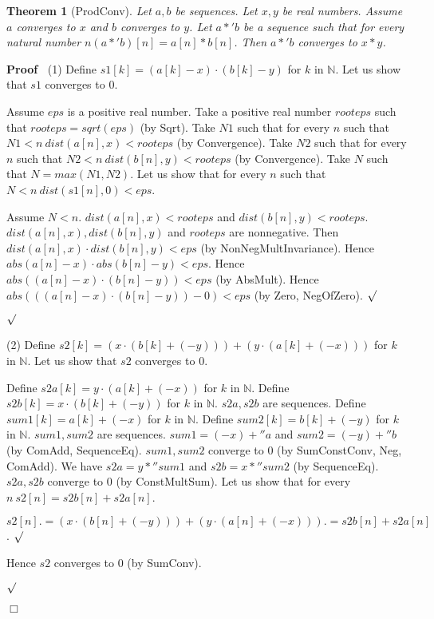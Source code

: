 \documentclass{article}
\newenvironment{forthel}{\begin{leftbar}}{\end{leftbar}}
\newenvironment{proof}{\noindent\textbf{Proof\ }}{\hspace*{\fill}$\Box$\medskip}
\newenvironment{subproof}{\begin{list}{}{}
		\item[\text{Proof}]}{\hfill $\surd$ \end{list}}
\newtheorem{theorem}{Theorem}
\newcommand{\NN}{\mathbb{N}}
\begin{document}
\begin{forthel}
	\begin{theorem}[ProdConv]
	Let $a,b$ be sequences. Let $x,y$ be real numbers. Assume $a$ converges to $x$ and $b$ converges to $y$.
	Let $a *' b$ be a sequence such that for every natural number $n (a *' b)[n] = a[n] * b[n]$.
	Then $a *' b$ converges to $x * y$.
	\end{theorem}
	\begin{proof}
	(1) Define $s1[k] = (a[k] - x) \cdot (b[k] - y)$ for $k$ in $\NN$.
	Let us show that $s1$ converges to $0$. 
	\begin{subproof}
    Assume $eps$ is a positive real number. 
    Take a positive real number $rooteps$ such that $rooteps = sqrt(eps)$ (by Sqrt).
    Take $N1$ such that for every $n$ such that $N1 < n \ dist(a[n],x) < rooteps$ (by Convergence).
    Take $N2$ such that for every $n$ such that $N2 < n \ dist(b[n],y) < rooteps$ (by Convergence).
    Take $N$ such that $N = max(N1,N2)$.
    Let us show that for every $n$ such that $N < n \ dist(s1[n],0) < eps$.
    \begin{subproof}
    Assume $N < n$.
    $dist(a[n],x) < rooteps$ and $dist(b[n],y) < rooteps$.
    $dist(a[n],x), dist(b[n],y)$ and $rooteps$ are nonnegative.
    Then $dist(a[n],x) \cdot dist(b[n],y) < eps$ (by NonNegMultInvariance).
    Hence $abs(a[n] - x) \cdot abs(b[n] - y) < eps$.
    Hence $abs((a[n] - x) \cdot (b[n] - y)) < eps$ (by AbsMult).
    Hence $abs(((a[n] - x) \cdot (b[n] - y)) - 0) < eps$ (by Zero, NegOfZero).
    \end{subproof}
	\end{subproof}
	(2) Define $s2[k] = (x \cdot (b[k] + (-y))) + (y \cdot (a[k] + (-x)))$ for $k$ in $\NN$.
	Let us show that $s2$ converges to $0$.
	\begin{subproof}
	Define $s2a[k] = y \cdot (a[k] + (-x))$ for $k$ in $\NN$.
	Define $s2b[k] = x \cdot (b[k] + (-y))$ for $k$ in $\NN$.
	$s2a, s2b$ are sequences.
	Define $sum1[k] = a[k] + (-x)$ for $k$ in $\NN$.
	Define $sum2[k] = b[k] + (-y)$ for $k$ in $\NN$.
	$sum1, sum2$ are sequences.
	$sum1 = (-x) +'' a$ and $sum2 = (-y) +'' b$ (by ComAdd, SequenceEq).
	$sum1, sum2$ converge to $0$ (by SumConstConv, Neg, ComAdd).
	We have $s2a = y *'' sum1$ and $s2b = x *'' sum2$ (by SequenceEq).
	$s2a, s2b$ converge to $0$ (by ConstMultSum). 
	Let us show that for every $n \ s2[n] = s2b[n] + s2a[n]$.
	\begin{subproof}
	$s2[n] .= (x \cdot (b[n] + (-y))) + (y \cdot (a[n] + (-x)))
	.= s2b[n] + s2a[n]$.
	\end{subproof}
	Hence $s2$ converges to $0$ (by SumConv).

\end{subproof}
\end{proof}
\end{forthel}
\end{document}
